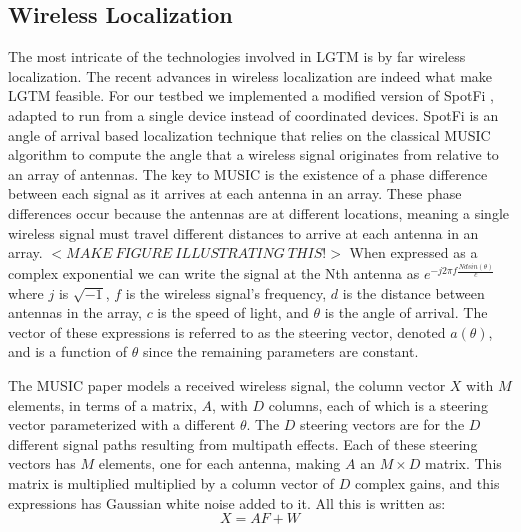 \documentclass[12pt]{report}
\begin{document}
\subsection{Wireless Localization}
The most intricate of the technologies involved in LGTM is by far wireless localization. The recent advances in wireless localization \cite{UbicarseKumar2014,SpotFiKotaru2015,ChronosSingleAPLocalizationVasisht2016} are indeed what make LGTM feasible. For our testbed we implemented a modified version of SpotFi \cite{SpotFiKotaru2015}, adapted to run from a single device instead of coordinated devices. SpotFi is an angle of arrival based localization technique that relies on the classical MUSIC algorithm \cite{MUSICSchmidt1986} to compute the angle that a wireless signal originates from relative to an array of antennas. The key to MUSIC is the existence of a phase difference between each signal as it arrives at each antenna in an array. These phase differences occur because the antennas are at different locations, meaning a single wireless signal must travel different distances to arrive at each antenna in an array. $<MAKE \: FIGURE \: ILLUSTRATING \: THIS!>$  When expressed as a complex exponential we can write the signal at the Nth antenna as $e^{-j 2 \pi f \frac{N d sin(\theta)}{c}}$ where $j$ is $\sqrt{-1}$, $f$ is the wireless signal's frequency, $d$ is the distance between antennas in the array, $c$ is the speed of light, and $\theta$ is the angle of arrival. The vector of these expressions is referred to as the steering vector, denoted $a(\theta)$, and is a function of $\theta$ since the remaining parameters are constant. 

The MUSIC paper models a received wireless signal, the column vector $X$ with $M$ elements, in terms of a matrix, $A$, with $D$ columns, each of which is a steering vector parameterized with a different $\theta$. The $D$ steering vectors are for the $D$ different signal paths resulting from multipath effects. Each of these steering vectors has $M$ elements, one for each antenna, making $A$ an $M \times D$ matrix. This matrix is multiplied multiplied by a column vector of $D$ complex gains, and this expressions has Gaussian white noise added to it. All this is written as: \\

$$X = AF + W$$
\end{document}
